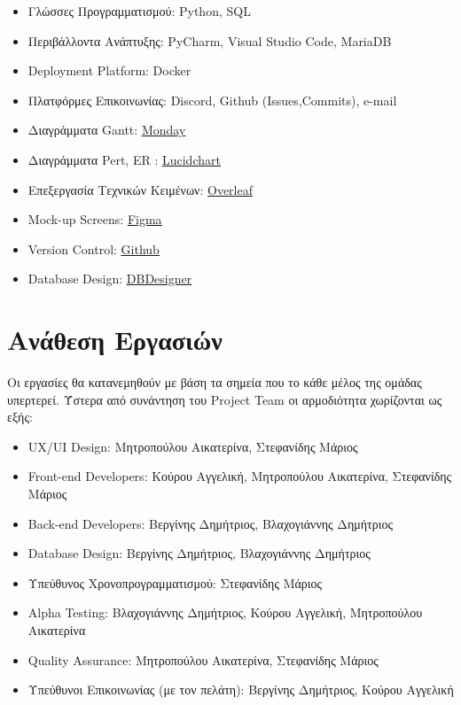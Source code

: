 \documentclass{article}
\begin{document}
\begin{itemize}
    \item Γλώσσες Προγραμματισμού: Python, SQL
    \item Περιβάλλοντα Ανάπτυξης: PyCharm, Visual Studio Code, MariaDB
    \item Deployment Platform: Docker
    \item Πλατφόρμες Επικοινωνίας: Discord, Github (Issues,Commits), e-mail
    \item Διαγράμματα Gantt: \underline{\href{www.monday.com}{Monday}}
    \item Διαγράμματα Pert, ER : \underline{\href{www.lucid.app}{Lucidchart}}
    \item Επεξεργασία Τεχνικών Κειμένων: \underline{\href{www.overfleaf.com}{Overleaf}}
    \item Mock-up Screens: \underline{\href{www.figma.com}{Figma}}
    \item Version Control: \underline{\href{www.github.com}{Github}}
    \item Database Design: \underline{\href{www.dbdesigner.net}{DBDesigner}}
\end{itemize}

\section{Ανάθεση Εργασιών}
Οι εργασίες θα κατανεμηθούν με βάση τα σημεία που το κάθε μέλος της ομάδας υπερτερεί. Ύστερα από συνάντηση του Project Team οι αρμοδιότητα χωρίζονται ως εξής:

\begin{itemize}
    \item UX/UI Design: Μητροπούλου Αικατερίνα, Στεφανίδης Μάριος
    \item Front-end Developers: Κούρου Αγγελική, Μητροπούλου Αικατερίνα, Στεφανίδης Μάριος
    \item Back-end Developers: Βεργίνης Δημήτριος, Βλαχογιάννης Δημήτριος
    \item Database Design: Βεργίνης Δημήτριος, Βλαχογιάννης Δημήτριος
    \item Υπεύθυνος Χρονοπρογραμματισμού: Στεφανίδης Μάριος
    \item Alpha Testing: Βλαχογιάννης Δημήτριος, Κούρου Αγγελική, Μητροπούλου Αικατερίνα
    \item Quality Assurance: Μητροπούλου Αικατερίνα, Στεφανίδης Μάριος
    \item Υπεύθυνοι Επικοινωνίας (με τον πελάτη): Βεργίνης Δημήτριος, Κούρου Αγγελική 
\end{itemize}
\end{document}

